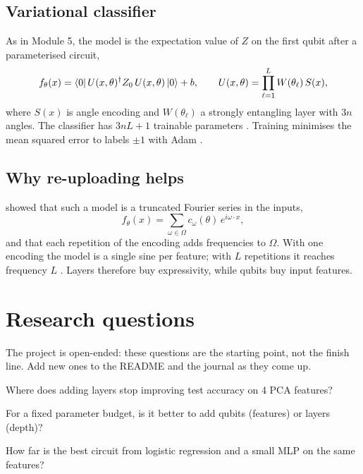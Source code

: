 \documentclass[11pt,a4paper]{article}
\begin{document}
\subsection{Variational classifier}
As in Module 5, the model is the expectation value of $Z$ on the first qubit after a parameterised
circuit,
\begin{equation}
  f_\theta(x)=\braket{0|\,U(x,\theta)^\dagger Z_0\,U(x,\theta)\,|0}+b,\qquad
  U(x,\theta)=\prod_{\ell=1}^{L}W(\theta_\ell)\,S(x),
\end{equation}
where $S(x)$ is angle encoding and $W(\theta_\ell)$ a strongly entangling layer with $3n$ angles. The
classifier has $3nL+1$ trainable parameters \citep{schuld2020circuit}. Training minimises the
mean squared error to labels $\pm1$ with Adam \citep{kingma2015}.

\subsection{Why re-uploading helps}
\citet{schuld2021fourier} showed that such a model is a truncated Fourier series in the inputs,
\begin{equation}
  f_\theta(x)=\sum_{\omega\in\Omega}c_\omega(\theta)\,e^{i\omega\cdot x},
\end{equation}
and that each repetition of the encoding adds frequencies to $\Omega$. With one encoding the model is
a single sine per feature; with $L$ repetitions it reaches frequency $L$
\citep{perezsalinas2020}. Layers therefore buy expressivity, while qubits buy input features.

\section{Research questions}
The project is open-ended: these questions are the starting point, not the finish line. Add new
ones to the README and the journal as they come up.

\begin{rqlist}
  \item Where does adding layers stop improving test accuracy on 4 PCA features?
  \item For a fixed parameter budget, is it better to add qubits (features) or layers (depth)?
  \item How far is the best circuit from logistic regression and a small MLP on the same features?
\end{rqlist}
\end{document}

